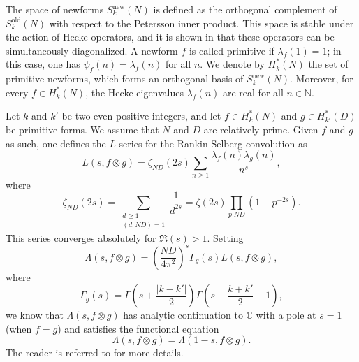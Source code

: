 \documentclass[12pt]{amsart}
\theoremstyle{plain}
\theoremstyle{definition}
\begin{document}
The space of newforms $S_k^{\mathrm{new}}(N)$ is defined as the orthogonal complement of $S_k^{\mathrm{old}}(N)$ with respect to the Petersson inner product. This space is stable under the action of Hecke operators, and it is shown in  \cite{Atkin-Li} that these operators can be simultaneously diagonalized. A newform $f$ is called primitive if $\lambda_f(1)=1$; in this case, one has $\psi_f(n)=\lambda_f(n)$ for all $n$. We denote by \(H_k^{*}(N)\) the set of primitive newforms, which forms an orthogonal basis of $S_k^{\mathrm{new}}(N)$. Moreover, for every $f\in H_k^{*}(N)$, the Hecke eigenvalues $\lambda_f(n)$ are real for all $n\in\mathbb{N}$.




Let $k$ and $k'$ be two even positive integers, and let $f\in H_{k}^*(N)$ and $g\in H_{k'}^*(D)$ be primitive forms. We assume that $N$ and $D$ are relatively prime. Given $f$ and $g$ as such, one defines the $L$-series for the Rankin-Selberg convolution as 
\[
L(s, f\otimes g)=\zeta_{ND}(2s)\sum_{n\geq 1}\frac{\lambda_f(n)\lambda_g(n)}{n^{s}},
\] 
where 
\[
\zeta_{ND}(2s)=\sum_{\substack{d\geq 1 \\ (d, ND)=1} } \frac{1}{d^{2s}}=\zeta(2s)\prod_{p|ND}(1-p^{-2s}).
\] 
This series converges absolutely for $\Re(s)>1$.  Setting \[
    \Lambda(s, f\otimes g) = \left(\frac{ND}{4\pi^2}\right)^s\Gamma_g(s) L(s, f \otimes g),
    \]
where
    \begin{equation}\label{eq:Gammag}
    \Gamma_g\left(s\right)
    =\Gamma\left(s+\frac{|k-k'|}{2}\right)
    \Gamma\left(s+\frac{k+k'}{2}-1\right) ,
    \end{equation}
we know that $\Lambda(s, f\otimes g)$ has analytic continuation to $\mathbb{C}$ with a pole at $s=1$ (when $f=g$) and satisfies the functional equation  
\begin{equation}\label{functional-equation}
 \Lambda(s, f\otimes g)=\Lambda(1-s, f\otimes g).
 \end{equation}
The reader is referred to  \cite[Section~4]{KMV RS} for more details.
\end{document}
